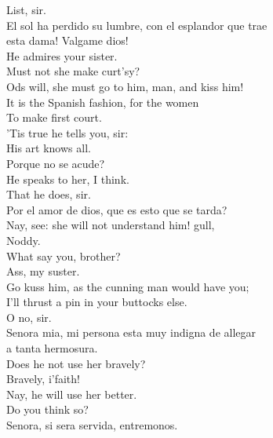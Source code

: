 \documentclass[a4paper,oneside]{memoir}
\begin{document}
\begin{drama*}
\facespeaks List, sir.\\
\surlyspeaks {} El sol ha perdido su lumbre, con el esplandor que trae\\
esta dama! Valgame dios!\\
\facespeaks {} He admires your sister.\\
\kastrilspeaks Must not she make curt'sy?\\
\subtlespeaks {} Ods will, she must go to him, man, and kiss him!\\
It is the Spanish fashion, for the women\\
To make first court.\\
\facespeaks {} 'Tis true he tells you, sir:\\
His art knows all.\\
\surlyspeaks {} Porque no se acude?\\
\kastrilspeaks He speaks to her, I think.\\
\facespeaks {} That he does, sir.\\
\surlyspeaks Por el amor de dios, que es esto que se tarda?\\
\kastrilspeaks Nay, see: she will not understand him! gull,\\
Noddy.\\
\pliantspeaks {} What say you, brother?\\
\kastrilspeaks {} Ass, my suster.\\
Go kuss him, as the cunning man would have you;\\
I'll thrust a pin in your buttocks else.\\
\facespeaks {} O no, sir.\\
\surlyspeaks Senora mia, mi persona esta muy indigna de allegar\\
a tanta hermosura.\\
\facespeaks {} Does he not use her bravely?\\
\kastrilspeaks Bravely, i'faith!\\
\facespeaks {} Nay, he will use her better.\\
\kastrilspeaks Do you think so?\\
\surlyspeaks {} Senora, si sera servida, entremonos.\\

\end{drama*}
\end{document}
